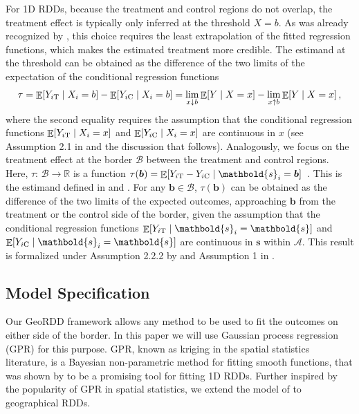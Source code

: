 \documentclass[letter,12pt]{article}
\DeclarePairedDelimiter{\squarebracket}{\lbrack}{\rbrack}
\newcommand{\sbr}[1]{\squarebracket*{#1}}
\DeclareMathOperator{\E}{\mathbb{E}}
\newcommand{\area}{\mathcal{A}}
\newcommand{\treat}{\mathrm{T}}
\newcommand{\ctrol}{\mathrm{C}}
\newcommand{\svec}{\mathbold{s}}
\newcommand{\border}{\mathcal{B}}
\newcommand{\sentinel}{\bm{b}}
\begin{document}
For 1D RDDs, because the treatment and control regions do not overlap, the treatment effect is typically only inferred at the threshold \(X=b\).
As was already recognized by \cite{thistlethwaite1960regression}, this choice requires the least extrapolation of the fitted regression functions, which makes the estimated treatment more credible.
The estimand at the threshold can be obtained as the difference of the two limits of the expectation of the conditional regression functions
\begin{equation}
    \label{eq:rdd_univ_estimand}
    \tau = \E\sbr{Y_{i\treat} \mid X_i=b} - \E\sbr{Y_{i\ctrol} \mid X_i=b} = \lim_{x \downarrow b} \E\sbr{Y \mid X=x} - \lim_{x \uparrow b} \E\sbr{Y \mid X=x}\,,
\end{equation}
where the second equality requires the assumption that the conditional regression functions \(\E\sbr{Y_{i\treat} \mid X_i=x}\) and \(\E\sbr{Y_{i\ctrol} \mid X_i=x}\) are continuous in \(x\) (see Assumption 2.1 in \cite{imbensrdd} and the discussion that follows).
Analogously, we focus on the treatment effect at the border \(\border\) between the treatment and control regions.
Here, \(\tau:\,\border \rightarrow \mathbb{R}\) is a function 
\(    \tau(\sentinel) =  \E\sbr{Y_{i\treat} - Y_{i\ctrol} \mid \svec_i = \sentinel} \) \,.
This is the estimand defined in \cite{imbens2011regression} and \cite{keele_titiunik_2015}.
For any \(\sentinel \in \border\), \(\tau(\sentinel)\) can be obtained as the difference of the two limits of the expected outcomes, approaching \(\sentinel\) from the treatment or the control side of the border, given the assumption that the conditional regression functions \(\E\sbr{Y_{i\treat} \mid \svec_i=\svec}\) and \(\E\sbr{Y_{i\ctrol} \mid \svec_i=\svec}\) are continuous in \(\svec\) within \(\area\).
This result is formalized under Assumption 2.2.2 by \cite{imbens2011regression} and Assumption 1 in \cite{keele_titiunik_2015}.



\hypertarget{model-specification}{%
\subsection{Model Specification}\label{model-specification}}


\label{sec:twogp}
Our GeoRDD framework allows any method to be used to fit the outcomes on either side of the border.
In this paper we will use Gaussian process regression (GPR) for this purpose.
GPR, known as kriging in the spatial statistics literature, is a Bayesian non-parametric method for fitting smooth functions, that was shown by \cite{Branson:2017qy} to be a promising tool for fitting 1D RDDs.
Further inspired by the popularity of GPR in spatial statistics, we extend the model of \cite{Branson:2017qy} to geographical RDDs.
\end{document}
